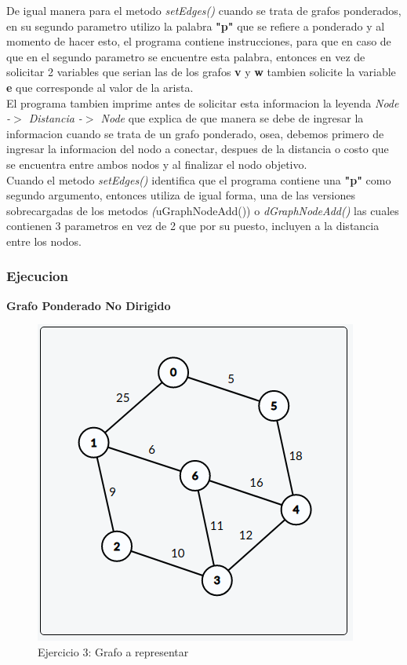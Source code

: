 \documentclass{article}
\begin{document}
				De igual manera para el metodo \emph{setEdges()} cuando se trata de grafos ponderados, en su segundo parametro utilizo la palabra \textbf{"p"} que se refiere a ponderado y al momento de hacer esto, el programa contiene instrucciones, para que en caso de que en el segundo parametro se encuentre esta palabra, entonces en vez de solicitar 2 variables que serian las de los grafos \textbf{v} y \textbf{w} tambien solicite la variable \textbf{e} que corresponde al valor de la arista.\\
				
				El programa tambien imprime antes de solicitar esta informacion la leyenda \textit{Node -$>$ Distancia -$>$ Node} que explica de que manera se debe de ingresar la informacion cuando se trata de un grafo ponderado, osea, debemos primero de ingresar la informacion del nodo a conectar, despues de la distancia o costo que se encuentra entre ambos nodos y al finalizar el nodo objetivo.\\
				
				Cuando el metodo \emph{setEdges()} identifica que el programa contiene una \textbf{"p"} como segundo argumento, entonces utiliza de igual forma, una de las versiones sobrecargadas de los metodos \emph(uGraphNodeAdd()) o \emph{dGraphNodeAdd()} las cuales contienen 3 parametros en vez de 2 que por su puesto, incluyen a la distancia entre los nodos.
				
				\newpage
				
			\subsubsection{Ejecucion}
			
			\textbf{Grafo Ponderado No Dirigido}\\
			
			\begin{figure}[H]
				\centering
				\includegraphics[scale= 0.6]{images/e3graph.png}
				\caption*{Ejercicio 3: Grafo a representar}
			\end{figure}
			
\end{document}
